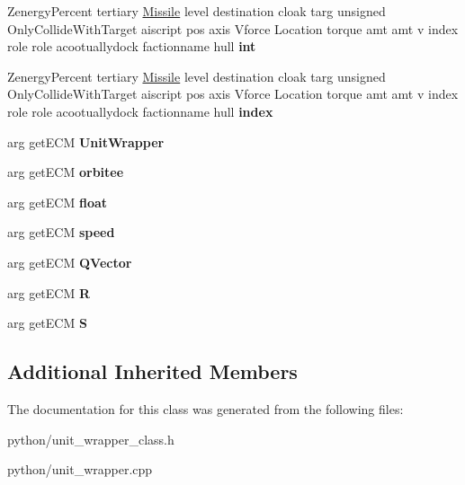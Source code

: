 \begin{DoxyCompactItemize}
\item 
Zenergy\+Percent tertiary \hyperlink{classMissile}{Missile} level destination cloak targ unsigned Only\+Collide\+With\+Target aiscript pos axis Vforce Location torque amt amt v index role role acootuallydock factionname hull {\bfseries int}\hypertarget{classUnitWrapper_acf63f115462c702079355abbfe706906}{}\label{classUnitWrapper_acf63f115462c702079355abbfe706906}

\item 
Zenergy\+Percent tertiary \hyperlink{classMissile}{Missile} level destination cloak targ unsigned Only\+Collide\+With\+Target aiscript pos axis Vforce Location torque amt amt v index role role acootuallydock factionname hull {\bfseries index}\hypertarget{classUnitWrapper_a1d611858415986f54cea386cba871130}{}\label{classUnitWrapper_a1d611858415986f54cea386cba871130}

\item 
arg get\+E\+CM {\bfseries Unit\+Wrapper}\hypertarget{classUnitWrapper_ae78c1908b0ed5fae709729bd5c5bdd09}{}\label{classUnitWrapper_ae78c1908b0ed5fae709729bd5c5bdd09}

\item 
arg get\+E\+CM {\bfseries orbitee}\hypertarget{classUnitWrapper_ad3cd383d152239673c2d368f4e5d96ec}{}\label{classUnitWrapper_ad3cd383d152239673c2d368f4e5d96ec}

\item 
arg get\+E\+CM {\bfseries float}\hypertarget{classUnitWrapper_ac678eeb1082946a7e82f85e7c737d6bb}{}\label{classUnitWrapper_ac678eeb1082946a7e82f85e7c737d6bb}

\item 
arg get\+E\+CM {\bfseries speed}\hypertarget{classUnitWrapper_ac3fd0ffc6492489f2e1829ba71505c7d}{}\label{classUnitWrapper_ac3fd0ffc6492489f2e1829ba71505c7d}

\item 
arg get\+E\+CM {\bfseries Q\+Vector}\hypertarget{classUnitWrapper_af9d8fdb0e28dbb1b34491dbac34e16f4}{}\label{classUnitWrapper_af9d8fdb0e28dbb1b34491dbac34e16f4}

\item 
arg get\+E\+CM {\bfseries R}\hypertarget{classUnitWrapper_a411fb14573c9ee4622aa6b163aa169be}{}\label{classUnitWrapper_a411fb14573c9ee4622aa6b163aa169be}

\item 
arg get\+E\+CM {\bfseries S}\hypertarget{classUnitWrapper_ac141b7c6d6aeba295d744352a78666e7}{}\label{classUnitWrapper_ac141b7c6d6aeba295d744352a78666e7}

\end{DoxyCompactItemize}
\subsection*{Additional Inherited Members}


The documentation for this class was generated from the following files\+:\begin{DoxyCompactItemize}
\item 
python/unit\+\_\+wrapper\+\_\+class.\+h\item 
python/unit\+\_\+wrapper.\+cpp\end{DoxyCompactItemize}

